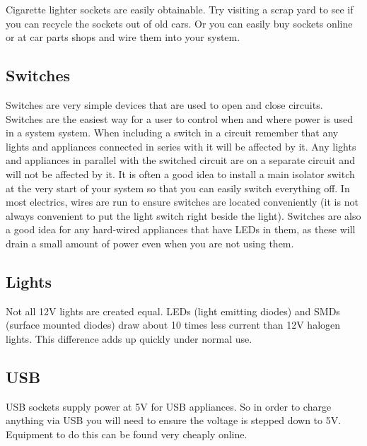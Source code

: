 \documentclass{article}
\theoremstyle{definition}
\theoremstyle{definition}
\theoremstyle{remark}
\begin{document}
    Cigarette lighter sockets are easily obtainable. Try visiting a scrap yard to see if you can recycle the sockets out of old cars. Or you can easily buy sockets online or at car parts shops and wire them into your system.
  

  \subsection{Switches} %
  \label{sub:switches}

    Switches are very simple devices that are used to open and close circuits. Switches are the easiest way for a user to control when and where power is used in a system system. When including a switch in a circuit remember that any lights and appliances connected in series with it will be affected by it. Any lights and appliances in parallel with the switched circuit are on a separate circuit and will not be affected by it. It is often a good idea to install a main isolator switch at the very start of your system so that you can easily switch everything off. In most electrics, wires are run to ensure switches are located conveniently (it is not always convenient to put the light switch right beside the light). Switches are also a good idea for any hard-wired appliances that have LEDs in them, as these will drain a small amount of power even when you are not using them.
  

  \subsection{Lights} %
  \label{sub:lights}

    Not all 12V lights are created equal. LEDs (light emitting diodes) and SMDs (surface mounted diodes) draw about 10 times less current than 12V halogen lights. This difference adds up quickly under normal use. 
  

  \subsection{USB} %
  \label{sub:usb}

    USB sockets supply power at 5V for USB appliances. So in order to charge anything via USB you will need to ensure the voltage is stepped down to 5V. Equipment to do this can be found very cheaply online. 
  
\end{document}
